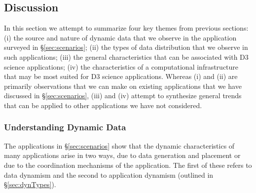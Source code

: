 

\subsection{Discussion}
\label{sec:discussion}

In this section we attempt to summarize four key themes from previous
sections: (i) the source and nature of dynamic data that we observe in
the application surveyed in \S\ref{sec:scenarios}; (ii) the types of
data distribution that we observe in such applications; (iii) the
general characteristics that can be associated with D3 science
applications; (iv) the characteristics of a computational
infrastructure that may be most suited for D3 science
applications. Whereas (i) and (ii) are primarily observations that we
can make on existing applications that we have discussed in
\S\ref{sec:scenarios}, (iii) and (iv) attempt to synthesize general
trends that can be applied to other applications we have not
considered. 





\subsubsection{Understanding Dynamic Data }

The applications in \S\ref{sec:scenarios} show that the dynamic
characteristics of many applications arise in two ways, due to data
generation and placement or due to the coordination
mechanisms of the application.
The first of these refers to data dynamism and the second to
application dynamism (outlined in \S\ref{sec:dynTypes}).

